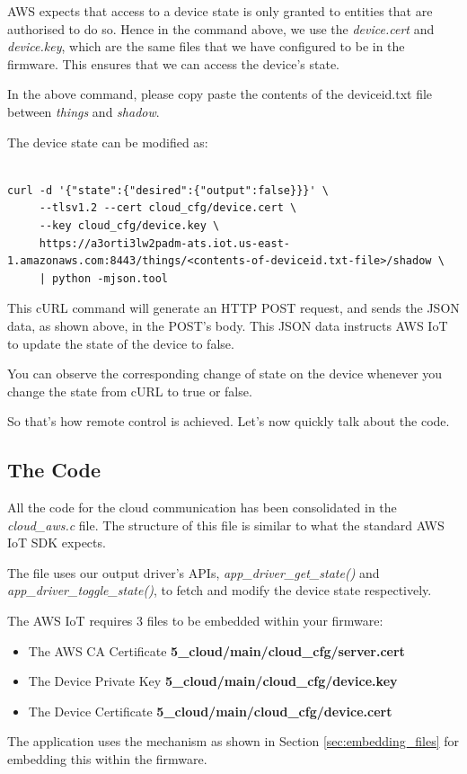 \documentclass[main.tex]{subfiles}
\begin{document}
AWS expects that access to a device state is only granted to entities that are authorised to do so. Hence in the command above, we use the \textit{device.cert} and \textit{device.key}, which are the same files that we have configured to be in the firmware. This ensures that we can access the device's state.

In the above command, please copy paste the contents of the deviceid.txt file between \textit{things} and \textit{shadow}.

The device state can be modified as:
\begin{verbatim}

curl -d '{"state":{"desired":{"output":false}}}' \ 
     --tlsv1.2 --cert cloud_cfg/device.cert \ 
     --key cloud_cfg/device.key \ 
     https://a3orti3lw2padm-ats.iot.us-east-1.amazonaws.com:8443/things/<contents-of-deviceid.txt-file>/shadow \
     | python -mjson.tool
\end{verbatim}

This cURL command will generate an HTTP POST request, and sends the JSON data, as shown above, in the POST's body. This JSON data instructs AWS IoT to update the state of the device to false.

You can observe the corresponding change of state on the device whenever you change the state from cURL to true or false.

So that's how remote control is achieved. Let's now quickly talk about the code.

\subsection{The Code}\index{The Code}
All the code for the cloud communication has been consolidated in the \textit{cloud\_aws.c} file. The structure of this file is similar to what the standard AWS IoT SDK expects.

The file uses our output driver's APIs, \textit{app\_driver\_get\_state()} and \textit{app\_driver\_toggle\_state()}, to fetch and modify the device state respectively.

The AWS IoT requires 3 files to be embedded within your firmware:
\begin{itemize}
        \item The AWS CA Certificate  \textbf{5\_cloud/main/cloud\_cfg/server.cert}
        \item The Device Private Key  \textbf{5\_cloud/main/cloud\_cfg/device.key}
        \item The Device Certificate  \textbf{5\_cloud/main/cloud\_cfg/device.cert}
\end{itemize}
The application uses the mechanism as shown in Section \ref{sec:embedding_files} for embedding this within the firmware.
\end{document}
